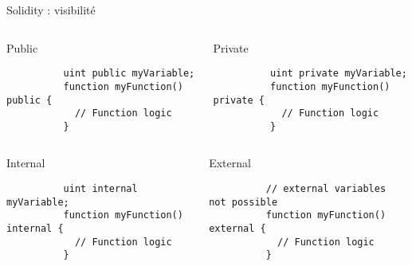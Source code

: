 \begin{frame}[fragile]{Solidity : visibilité}
  \begin{columns}
    \begin{column}{0.47\textwidth}
      \begin{block}{Public}
        \begin{verbatim}
          uint public myVariable;
          function myFunction() public {
            // Function logic
          }
        \end{verbatim}
      \end{block}
    \end{column}
    \vspace{0.03\textwidth}
    \begin{column}{0.47\textwidth}
      \begin{block}{Private}
        \begin{verbatim}
          uint private myVariable;
          function myFunction() private {
            // Function logic
          }
        \end{verbatim}
      \end{block}
    \end{column}
  \end{columns}

  \begin{columns}
    \begin{column}{0.47\textwidth}
      \begin{block}{Internal}
        \begin{verbatim}
          uint internal myVariable;
          function myFunction() internal {
            // Function logic
          }
        \end{verbatim}
      \end{block}
    \end{column}
    \vspace{0.03\textwidth}
    \begin{column}{0.47\textwidth}
      \begin{block}{External}
        \begin{verbatim}
          // external variables not possible 
          function myFunction() external {
            // Function logic
          }
        \end{verbatim}
      \end{block}
    \end{column}
  \end{columns}
\end{frame}

